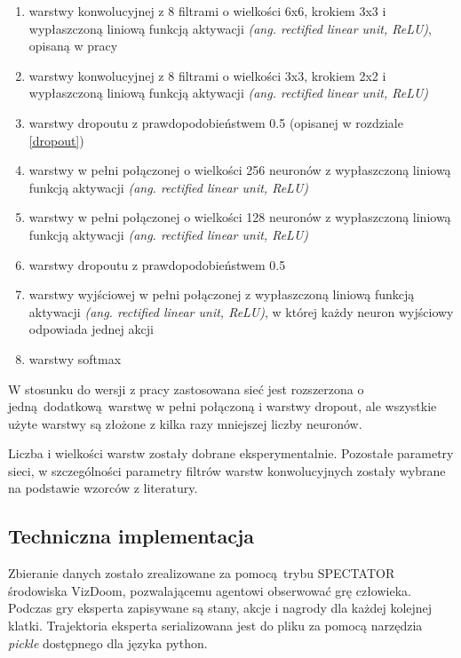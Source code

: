\begin{enumerate}
\item{warstwy konwolucyjnej z 8 filtrami o wielkości 6x6, krokiem 3x3 i wypłaszczoną liniową funkcją aktywacji \textit{(ang. rectified linear unit, ReLU)}, opisaną w pracy \cite{AISTATS2011_GlorotBB11}}
\item{warstwy konwolucyjnej z 8 filtrami o wielkości 3x3, krokiem 2x2 i wypłaszczoną liniową funkcją aktywacji \textit{(ang. rectified linear unit, ReLU)}}
\item{warstwy dropoutu z prawdopodobieństwem 0.5 (opisanej w rozdziale \ref{dropout})} 
\item{warstwy w pełni połączonej o wielkości 256 neuronów z wypłaszczoną liniową funkcją aktywacji \textit{(ang. rectified linear unit, ReLU)}}
\item{warstwy w pełni połączonej o wielkości 128 neuronów z wypłaszczoną liniową funkcją aktywacji \textit{(ang. rectified linear unit, ReLU)}}
\item{warstwy dropoutu z prawdopodobieństwem 0.5}
\item{warstwy wyjściowej w pełni połączonej z wypłaszczoną liniową funkcją aktywacji \textit{(ang. rectified linear unit, ReLU)}, w której każdy neuron wyjściowy odpowiada jednej akcji}
\item{warstwy softmax}
\end{enumerate}

W stosunku do wersji z pracy \cite{DBLP:journals/corr/KempkaWRTJ16} zastosowana sieć jest rozszerzona o jedną dodatkową warstwę w pełni połączoną i warstwy dropout, ale wszystkie użyte warstwy są złożone z kilka razy mniejszej liczby neuronów.

Liczba i wielkości warstw zostały dobrane eksperymentalnie. Pozostałe parametry sieci, w szczególności parametry filtrów warstw konwolucyjnych zostały wybrane na podstawie wzorców z literatury.

\subsection{Techniczna implementacja} \label{behavioral_cloning_tech}

Zbieranie danych zostało zrealizowane za pomocą trybu SPECTATOR środowiska VizDoom, pozwalającemu agentowi obserwować grę człowieka. Podczas gry eksperta zapisywane są stany, akcje i nagrody dla każdej kolejnej klatki. Trajektoria eksperta serializowana jest do pliku za pomocą narzędzia \textit{pickle} dostępnego dla języka python.

